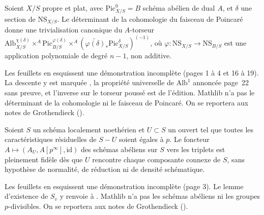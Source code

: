\begin{encadre}
\begin{conjecture*}
Soient $X/S$ propre et plat, avec $\mathrm{Pic}^0_{X/S} = B$ schéma abélien de dual $A$, et $\delta$ une section de $\mathrm{NS}_{X/S}$. Le déterminant de la cohomologie du faisceau de Poincaré donne une trivialisation canonique du $A$-torseur $\mathrm{Alb}^{\chi(\delta)}_{X/S} \times^A \mathrm{Pic}^{\varphi(\delta)}_{B/S} \times^A (\widetilde{\varphi(\delta)}_*\mathrm{Pic}^\delta_{X/S})^{(-1)}$, où $\varphi : \mathrm{NS}_{X/S} \to \mathrm{NS}_{B/S}$ est une application polynomiale de degré $n - 1$, non additive.
\end{conjecture*}
\end{encadre}
{\small Les feuillets en esquissent une démonstration incomplète (pages 1 à 4 et 16 à 19). La descente y est marquée , la propriété universelle de $\mathrm{Alb}^1$ annoncée page~22 sans preuve, et l'inverse sur le torseur poussé est de l'édition. Mathlib n'a pas le déterminant de la cohomologie ni le faisceau de Poincaré. On se reportera aux notes de Grothendieck ().\par}

\begin{encadre}
\begin{conjecture*}
Soient $S$ un schéma localement noethérien et $U \subset S$ un ouvert tel que toutes les caractéristiques résiduelles de $S - U$ soient égales à $p$. Le foncteur $A \mapsto (A_U, A[p^\infty], \mathrm{id})$ des schémas abéliens sur $S$ vers les triplets est pleinement fidèle dès que $U$ rencontre chaque composante connexe de $S$, sans hypothèse de normalité, de réduction ni de densité schématique.
\end{conjecture*}
\end{encadre}
{\small Les feuillets en esquissent une démonstration incomplète (page 3). Le lemme d'existence de $S_v$ y renvoie à . Mathlib n'a pas les schémas abéliens ni les groupes $p$-divisibles. On se reportera aux notes de Grothendieck ().\par}


